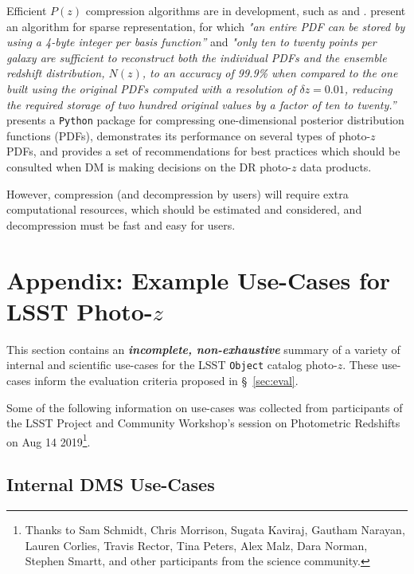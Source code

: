 \documentclass[DM,lsstdraft,toc]{lsstdoc}
\begin{document}
Efficient $P(z)$ compression algorithms are in development, such as \citet{2014MNRAS.441.3550C} and \citet{2018AJ....156...35M}.
\citet{2014MNRAS.441.3550C} present an algorithm for sparse representation, for which {\it "an entire PDF can be stored by using a 4-byte integer per basis function''} and {\it "only ten to twenty points per galaxy are sufficient to reconstruct both the individual PDFs and the ensemble redshift distribution, $N(z)$, to an accuracy of 99.9\% when compared to the one built using the original PDFs computed with a resolution of $\delta z = 0.01$, reducing the required storage of two hundred original values by a factor of ten to twenty.''} 
\citet{2018AJ....156...35M} presents a {\tt Python} package for compressing one-dimensional posterior distribution functions (PDFs), demonstrates its performance on several types of photo-$z$ PDFs, and provides a set of recommendations for best practices which should be consulted when DM is making decisions on the DR photo-$z$ data products.

However, compression (and decompression by users) will require extra computational resources, which should be estimated and considered, and decompression must be fast and easy for users.


\clearpage
\section{Appendix: Example Use-Cases for LSST Photo-$z$} \label{sec:use}

This section contains an \textbf{\textit{incomplete, non-exhaustive}} summary of a variety of internal and scientific use-cases for the LSST {\tt Object} catalog photo-$z$.
These use-cases inform the evaluation criteria proposed in \S~\ref{sec:eval}. 

Some of the following information on use-cases was collected from participants of the LSST Project and Community Workshop's session on Photometric Redshifts on Aug 14 2019\footnote{Thanks to Sam Schmidt, Chris Morrison, Sugata Kaviraj, Gautham Narayan, Lauren Corlies, Travis Rector, Tina Peters, Alex Malz, Dara Norman, Stephen Smartt, and other participants from the science community.}.

\subsection{Internal DMS Use-Cases}\label{ssec:use_dm}
\end{document}
